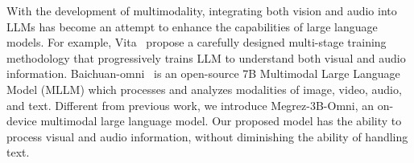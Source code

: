 With the development of multimodality, integrating both vision and audio into LLMs has become an attempt to enhance the capabilities of large language models. For example, Vita~\cite{fu2024vita} propose a carefully designed multi-stage training methodology that progressively trains LLM to understand both visual and audio information. Baichuan-omni~\cite{li2024baichuanomni} is an open-source 7B Multimodal Large Language Model (MLLM) which processes and analyzes modalities of image, video, audio, and text. Different from previous work, we introduce Megrez-3B-Omni, an on-device multimodal large language model. Our proposed model has the ability to process visual and audio information, without diminishing the ability of handling text.
